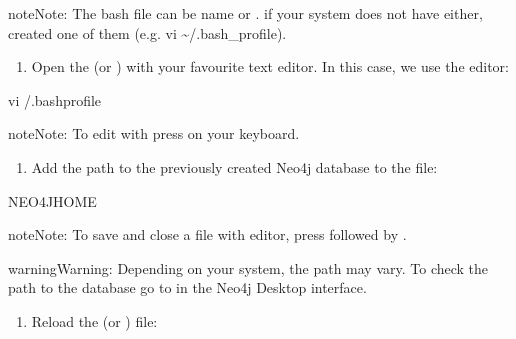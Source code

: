 \documentclass[letterpaper,10pt,english]{sphinxmanual}
\begin{document}
\begin{sphinxadmonition}{note}{Note:}
The bash file can be name  or . if your system does not have either, created one of them (e.g. vi \textasciitilde{}/.bash\_profile).
\end{sphinxadmonition}
\begin{enumerate}
%
\item {} 
Open the  (or ) with your favourite text editor. In this case, we use the  editor:

\end{enumerate}

\begin{sphinxVerbatim}[commandchars=\\\{\}]
\PYGZdl{} vi \PYGZti{}/.bash\PYGZus{}profile
\end{sphinxVerbatim}

\begin{sphinxadmonition}{note}{Note:}
To edit with  press  on your keyboard.
\end{sphinxadmonition}
\begin{enumerate}
%
\item {} 
Add the path to the previously created Neo4j database to the file:

\end{enumerate}

\begin{sphinxVerbatim}[commandchars=\\\{\}]
 NEO4J\PYGZus{}HOME
\end{sphinxVerbatim}

\begin{sphinxadmonition}{note}{Note:}
To save and close a file with  editor, press  followed by .
\end{sphinxadmonition}

\begin{sphinxadmonition}{warning}{Warning:}
Depending on your system, the path may vary. To check the path to the database go to  in the Neo4j Desktop interface.
\end{sphinxadmonition}
\begin{enumerate}
%
\item {} 
Reload the  (or )  file:

\end{enumerate}
\end{document}
